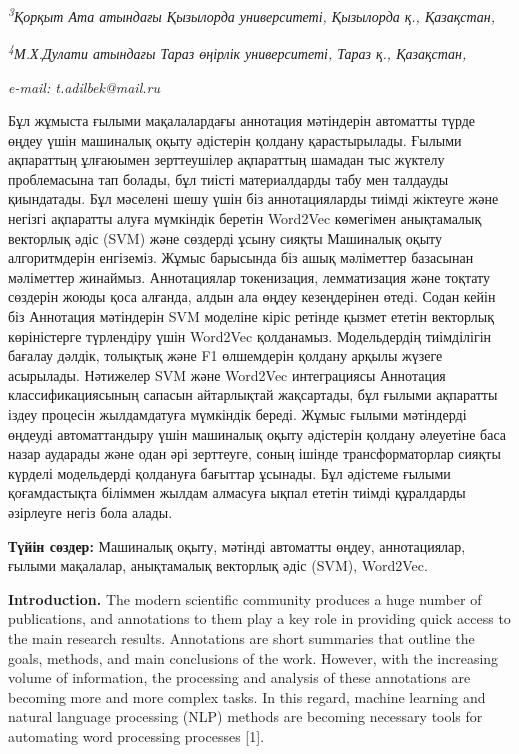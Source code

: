 \documentclass[
]{article}
\begin{document}
\emph{\textsuperscript{3}Қорқыт Ата атындағы Қызылорда университеті,
Қызылорда қ., Қазақстан,}

\emph{\textsuperscript{4}М.Х.Дулати атындағы Тараз өңірлік университеті,
Тараз қ., Қазақстан,}

\emph{e-mail: t.adilbek@mail.ru}

Бұл жұмыста ғылыми мақалалардағы аннотация мәтіндерін автоматты түрде
өңдеу үшін машиналық оқыту әдістерін қолдану қарастырылады. Ғылыми
ақпараттың ұлғаюымен зерттеушілер ақпараттың шамадан тыс жүктелу
проблемасына тап болады, бұл тиісті материалдарды табу мен талдауды
қиындатады. Бұл мәселені шешу үшін біз аннотацияларды тиімді жіктеуге
және негізгі ақпаратты алуға мүмкіндік беретін Word2Vec көмегімен
анықтамалық векторлық әдіс (SVM) және сөздерді ұсыну сияқты Машиналық
оқыту алгоритмдерін енгіземіз. Жұмыс барысында біз ашық мәліметтер
базасынан мәліметтер жинаймыз. Аннотациялар токенизация, лемматизация
және тоқтату сөздерін жоюды қоса алғанда, алдын ала өңдеу кезеңдерінен
өтеді. Содан кейін біз Аннотация мәтіндерін SVM моделіне кіріс ретінде
қызмет ететін векторлық көріністерге түрлендіру үшін Word2Vec
қолданамыз. Модельдердің тиімділігін бағалау дәлдік, толықтық және F1
өлшемдерін қолдану арқылы жүзеге асырылады. Нәтижелер SVM және Word2Vec
интеграциясы Аннотация классификациясының сапасын айтарлықтай
жақсартады, бұл ғылыми ақпаратты іздеу процесін жылдамдатуға мүмкіндік
береді. Жұмыс ғылыми мәтіндерді өңдеуді автоматтандыру үшін машиналық
оқыту әдістерін қолдану әлеуетіне баса назар аударады және одан әрі
зерттеуге, соның ішінде трансформаторлар сияқты күрделі модельдерді
қолдануға бағыттар ұсынады. Бұл әдістеме ғылыми қоғамдастықта біліммен
жылдам алмасуға ықпал ететін тиімді құралдарды әзірлеуге негіз бола
алады.

\textbf{Түйін сөздер:} Машиналық оқыту, мәтінді автоматты өңдеу,
аннотациялар, ғылыми мақалалар, анықтамалық векторлық әдіс (SVM),
Word2Vec.

\textbf{Introduction.} The modern scientific community produces a huge
number of publications, and annotations to them play a key role in
providing quick access to the main research results. Annotations are
short summaries that outline the goals, methods, and main conclusions of
the work. However, with the increasing volume of information, the
processing and analysis of these annotations are becoming more and more
complex tasks. In this regard, machine learning and natural language
processing (NLP) methods are becoming necessary tools for automating
word processing processes {[}1{]}.
\end{document}
